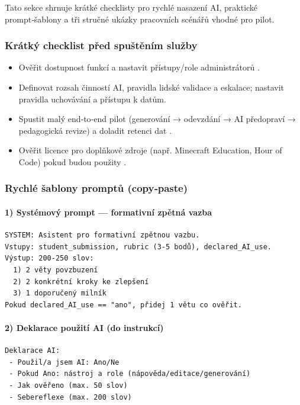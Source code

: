 Tato sekce shrnuje krátké checklisty pro rychlé nasazení AI, praktické prompt‑šablony a tři stručné ukázky pracovních scénářů vhodné pro pilot.

\subsubsection*{Krátký checklist před spuštěním služby}
\begin{itemize}
  \item Ověřit dostupnost funkcí a nastavit přístupy/role administrátorů \cite{kb_ai_101_tipu_pdf_04e4a115_page_8_1}.
  \item Definovat rozsah činností AI, pravidla lidské validace a eskalace; nastavit pravidla uchovávání a přístupu k datům.
  \item Spustit malý end‑to‑end pilot (generování → odevzdání → AI předopraví → pedagogická revize) a doladit retenci dat \cite{kb_ai_101_tipu_pdf_04e4a115_page_8_1}.
  \item Ověřit licence pro doplňkové zdroje (např. Minecraft Education, Hour of Code) pokud budou použity \cite{kb_ai_101_tipu_pdf_04e4a115_page_15_2}.
\end{itemize}

\subsubsection*{Rychlé šablony promptů (copy‑paste)}
\paragraph{1) Systémový prompt — formativní zpětná vazba}
\begin{verbatim}
SYSTEM: Asistent pro formativní zpětnou vazbu.
Vstupy: student_submission, rubric (3-5 bodů), declared_AI_use.
Výstup: 200-250 slov:
  1) 2 věty povzbuzení
  2) 2 konkrétní kroky ke zlepšení
  3) 1 doporučený milník
Pokud declared_AI_use == "ano", přidej 1 větu co ověřit.
\end{verbatim}

\paragraph{2) Deklarace použití AI (do instrukcí)}
\begin{verbatim}
Deklarace AI:
 - Použil/a jsem AI: Ano/Ne
 - Pokud Ano: nástroj a role (nápověda/editace/generování)
 - Jak ověřeno (max. 50 slov)
 - Sebereflexe (max. 200 slov)
\end{verbatim}

